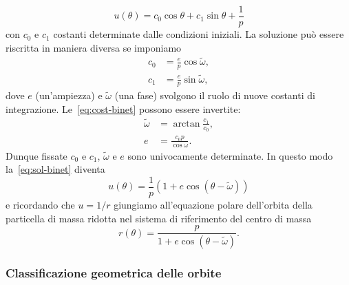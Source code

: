 \begin{equation}
  \label{eq:sol-binet}
  u(\theta) = c_0\cos\theta + c_1\sin\theta + \frac{1}{p}
\end{equation}
con $c_0$ e $c_1$ costanti determinate dalle condizioni iniziali. La soluzione
può essere riscritta in maniera diversa se imponiamo
\begin{subequations}
  \label{eq:cost-binet}
  \begin{align}
    c_0 &= \frac{e}{p}\cos\tilde\omega, \\
    c_1 &= \frac{e}{p}\sin\tilde\omega,
  \end{align}
\end{subequations}
dove $e$ (un'ampiezza) e $\tilde\omega$ (una fase) svolgono il ruolo di nuove
costanti di integrazione. Le~\eqref{eq:cost-binet} possono essere invertite:
\begin{subequations}
  \begin{align}
    \tilde\omega &= \arctan \frac{c_1}{c_0}, \\
    e &= \frac{c_0p}{\cos\omega}.
  \end{align}
\end{subequations}
Dunque fissate $c_0$ e $c_1$, $\tilde\omega$ e $e$ sono univocamente
determinate. In questo modo la~\eqref{eq:sol-binet} diventa
\begin{equation}
  u(\theta) = \frac{1}{p}(1+e\cos(\theta-\tilde\omega))
\end{equation}
e ricordando che $u=1/r$ giungiamo all'equazione polare dell'orbita della
particella di massa ridotta nel sistema di riferimento del centro di massa
\begin{equation}
  \label{eq:orbita}
  r(\theta) = \frac{p}{1+e\cos(\theta-\tilde\omega)}.
\end{equation}

\subsubsection{Classificazione geometrica delle orbite}
\label{sec:class-geom-orbite}

